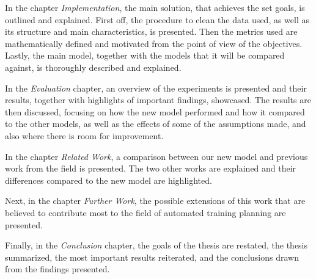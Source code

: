 In the chapter \textit{Implementation}, the main solution, that achieves the set goals, is outlined and explained.
First off, the procedure to clean the data used, as well as its structure and main characteristics, is presented.
Then the metrics used are mathematically defined and motivated from the point of view of the objectives.
Lastly, the main model, together with the models that it will be compared against, is thoroughly described and explained.

In the \textit{Evaluation} chapter, an overview of the experiments is presented and their results, together with highlights of important findings, showcased.
The results are then discussed, focusing on how the new model performed and how it compared to the other models, as well as the effects of some of the assumptions made, and also where there is room for improvement.

In the chapter \textit{Related Work}, a comparison between our new model and previous work from the field is presented.
The two other works are explained and their differences compared to the new model are highlighted.

Next, in the chapter \textit{Further Work}, the possible extensions of this work that are believed to contribute most to the field of automated training planning are presented. 

Finally, in the \textit{Conclusion} chapter, the goals of the thesis are restated, the thesis summarized, the most important results reiterated, and the conclusions drawn from the findings presented.



